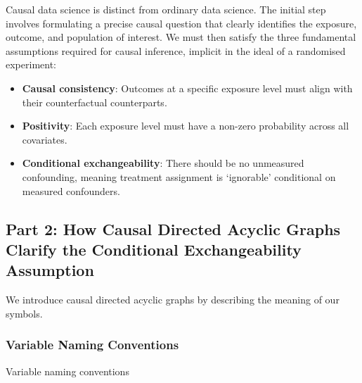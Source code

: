 \documentclass[
  single column]{article}
\providecommand{\tightlist}{%
  \setlength{\itemsep}{0pt}\setlength{\parskip}{0pt}}\usepackage{longtable,booktabs,array}
\begin{document}
Causal data science is distinct from ordinary data science. The initial
step involves formulating a precise causal question that clearly
identifies the exposure, outcome, and population of interest. We must
then satisfy the three fundamental assumptions required for causal
inference, implicit in the ideal of a randomised experiment:

\begin{itemize}
\tightlist
\item
  \textbf{Causal consistency}: Outcomes at a specific exposure level
  must align with their counterfactual counterparts.
\item
  \textbf{Positivity}: Each exposure level must have a non-zero
  probability across all covariates.
\item
  \textbf{Conditional exchangeability}: There should be no unmeasured
  confounding, meaning treatment assignment is `ignorable' conditional
  on measured confounders.
\end{itemize}

\newpage{}

\subsection{Part 2: How Causal Directed Acyclic Graphs Clarify the
Conditional Exchangeability Assumption}\label{id-sec-2}

We introduce causal directed acyclic graphs by describing the meaning of
our symbols.

\subsubsection{Variable Naming
Conventions}\label{variable-naming-conventions}

\begin{table}

\caption{\label{tbl-terminology}Variable naming conventions}

\centering{

\terminologylocalconventionssimple

}

\end{table}%
\end{document}
